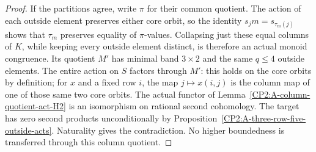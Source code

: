 \begin{proof}
If the partitions agree, write $\pi$ for their common quotient.
The action of each outside element preserves either core orbit,
so the identity $s_jm=s_{\tau_m(j)}$ shows that $\tau_m$
preserves equality of $\pi$-values. Collapsing just these equal
columns of $K$, while keeping every outside element distinct,
is therefore an actual monoid congruence. Its quotient $M'$
has minimal band $3\times2$ and the same $q\leq4$ outside
elements. The entire action on $S$ factors through $M'$:
this holds on the core orbits by definition; for $x$ and a
fixed row $i$, the map $j\mapsto x(i,j)$ is the column map
of one of those same two core orbits. The actual functor of
Lemma~\ref{CP2:A-column-quotient-act-H2} is an isomorphism on
rational second cohomology. The target has zero second products
unconditionally by Proposition~\ref{CP2:A-three-row-five-outside-acts}.
Naturality gives the contradiction. No higher boundedness is
transferred through this column quotient.
\end{proof}

